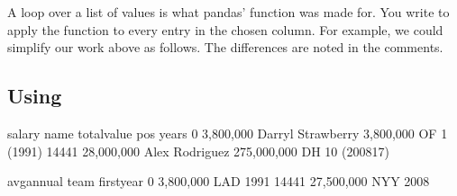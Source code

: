 \documentclass[letterpaper,10pt,english]{sphinxmanual}
\begin{document}
A loop over a list of values is what pandas’  function was made for.  You write  to apply the function  to every entry in the chosen column.  For example, we could simplify our work above as follows.  The differences are noted in the comments.


\subsection{Using }
\label{\detokenize{chapter-11-processing-rows:using-apply}}
\begin{sphinxVerbatim}[commandchars=\\\{\}]
         
     \PYG{p}{[}\PYG{p}{]}  
          \PYG{p}{[}\PYG{p}{]}   
          \PYG{p}{[}\PYG{p}{]}   
\PYG{p}{[}\PYG{p}{]}  \PYG{p}{[}\PYG{p}{]}  

\PYG{p}{[}\PYG{p}{[}\PYG{p}{]}\PYG{p}{]} 
\end{sphinxVerbatim}

\begin{sphinxVerbatim}[commandchars=\\\{\}]
             salary               name    total\PYGZus{}value pos         years  \PYGZbs{}
0       \PYGZdl{} 3,800,000  Darryl Strawberry    \PYGZdl{} 3,800,000  OF      1 (1991)   
14441  \PYGZdl{} 28,000,000     Alex Rodriguez  \PYGZdl{} 275,000,000  DH  10 (2008\PYGZhy{}17)   

         avg\PYGZus{}annual team  first\PYGZus{}year  
0       \PYGZdl{} 3,800,000  LAD        1991  
14441  \PYGZdl{} 27,500,000  NYY        2008  
\end{sphinxVerbatim}
\end{document}
